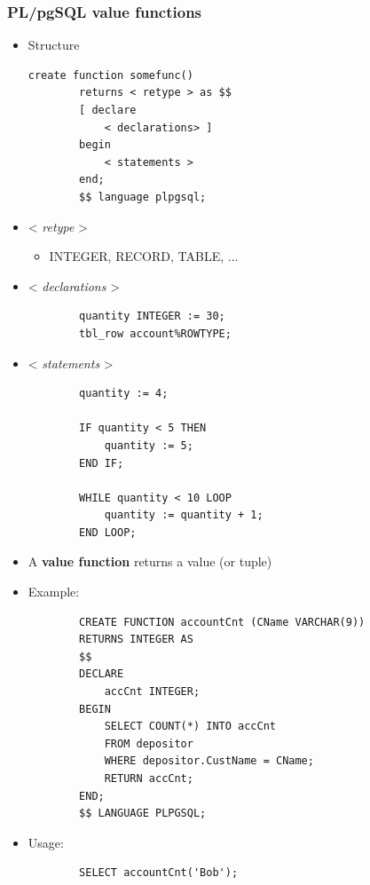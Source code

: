 \subsubsection{PL/pgSQL value functions}
\begin{itemize}[label=\(\rhd\)]
    \item Structure
    \begin{lstlisting}[]
        create function somefunc()
        returns < retype > as $$
        [ declare 
            < declarations> ]
        begin 
            < statements >
        end;
        $$ language plpgsql;
    \end{lstlisting}
    \item < \textit{retype} >
        \begin{itemize}[label=\(\rhd\)]
            \item INTEGER, RECORD, TABLE, ...
        \end{itemize}
    \item < \textit{declarations} >
    \begin{lstlisting}
        quantity INTEGER := 30;
        tbl_row account%ROWTYPE;
    \end{lstlisting}
    \item < \textit{statements} >
    \begin{lstlisting}
        quantity := 4;

        IF quantity < 5 THEN
            quantity := 5;
        END IF;

        WHILE quantity < 10 LOOP
            quantity := quantity + 1;
        END LOOP;     
    \end{lstlisting}
    \item A \textbf{value function} returns a value (or tuple) 
    \item Example:
    \begin{lstlisting}
        CREATE FUNCTION accountCnt (CName VARCHAR(9))
        RETURNS INTEGER AS
        $$
        DECLARE
            accCnt INTEGER;
        BEGIN 
            SELECT COUNT(*) INTO accCnt
            FROM depositor
            WHERE depositor.CustName = CName;
            RETURN accCnt;
        END;
        $$ LANGUAGE PLPGSQL;
    \end{lstlisting}
    \item Usage: \begin{lstlisting}
        SELECT accountCnt('Bob');
    \end{lstlisting}
\end{itemize}

